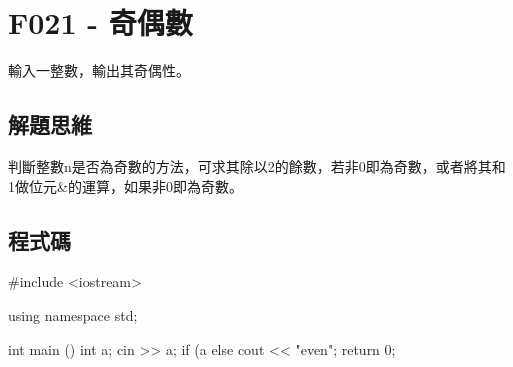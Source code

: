 \section{F021 - 奇偶數}
輸入一整數，輸出其奇偶性。

\subsection{解題思維}
判斷整數n是否為奇數的方法，可求其除以2的餘數，若非0即為奇數，或者將其和1做位元\&的運算，如果非0即為奇數。
\begin{inside}
	if (n%
	if (n&1) { // n 為奇數
\end{inside}	
\subsection{程式碼}
\begin{cppcode}
	#include <iostream>
	
	using namespace std;
	
	int main ()
	{
		int a;
		cin >> a;
		if (a%
		else cout << "even";
		return 0;
	}
\end{cppcode}
